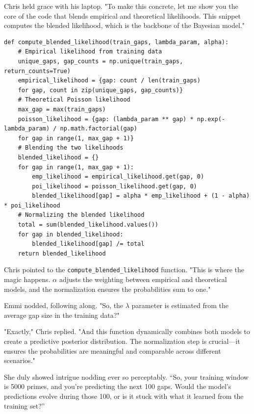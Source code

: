 Chris held grace with his laptop. "To make this concrete, let me show you the core of the code that blends empirical and theoretical likelihoods. This snippet computes the blended likelihood, which is the backbone of the Bayesian model."


{
\tiny %
\begin{verbatim}
def compute_blended_likelihood(train_gaps, lambda_param, alpha):
    # Empirical likelihood from training data
    unique_gaps, gap_counts = np.unique(train_gaps, return_counts=True)
    empirical_likelihood = {gap: count / len(train_gaps) 
    for gap, count in zip(unique_gaps, gap_counts)}
    # Theoretical Poisson likelihood
    max_gap = max(train_gaps)
    poisson_likelihood = {gap: (lambda_param ** gap) * np.exp(-lambda_param) / np.math.factorial(gap) 
    for gap in range(1, max_gap + 1)}
    # Blending the two likelihoods
    blended_likelihood = {}
    for gap in range(1, max_gap + 1):
        emp_likelihood = empirical_likelihood.get(gap, 0)
        poi_likelihood = poisson_likelihood.get(gap, 0)
        blended_likelihood[gap] = alpha * emp_likelihood + (1 - alpha) * poi_likelihood
    # Normalizing the blended likelihood
    total = sum(blended_likelihood.values())
    for gap in blended_likelihood:
        blended_likelihood[gap] /= total
    return blended_likelihood
\end{verbatim}
} %


Chris pointed to the \texttt{compute\_blended\_likelihood} function. "This is where the magic happens. \(\alpha\) adjusts the weighting between empirical and theoretical models, and the normalization ensures the probabilities sum to one."

Emmi nodded, following along. "So, the \(\lambda\) parameter is estimated from the average gap size in the training data?"

"Exactly," Chris replied. "And this function dynamically combines both models to create a predictive posterior distribution. The normalization step is crucial—it ensures the probabilities are meaningful and comparable across different scenarios."

She duly showed intrigue nodding ever so perceptably. “So,  your training window is 5000 primes, and you’re predicting the next 100 gaps. Would the model’s predictions evolve during those 100, or is it stuck with what it learned from the training set?”

